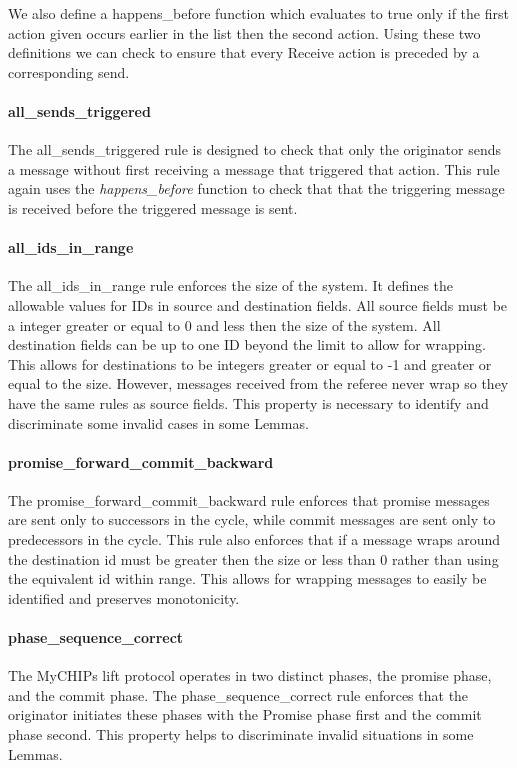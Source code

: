 \documentclass[runningheads]{llncs}
\begin{document}
We also define a happens\_before function which evaluates to true only if the first action given occurs earlier in the list then the second action. 
Using these two definitions we can check to ensure that every Receive action is preceded by a corresponding send. 

\paragraph{all\_sends\_triggered}
The all\_sends\_triggered rule is designed to check that only the originator sends a message without first receiving a message that triggered that action. This rule again uses the \emph{happens\_before} function to check that that the triggering message is received before the triggered message is sent. 

\paragraph{all\_ids\_in\_range}
The all\_ids\_in\_range rule enforces the size of the system. It defines the allowable values for IDs in source and destination fields. All source fields must be a integer greater or equal to 0 and less then the size of the system. All destination fields can be up to one ID beyond the limit to allow for wrapping. This allows for destinations to be integers greater or equal to -1 and greater or equal to the size. However, messages received from the referee never wrap so they have the same rules as source fields. This property is necessary to identify and discriminate some invalid cases in some Lemmas. 

\paragraph{promise\_forward\_commit\_backward}
The promise\_forward\_commit\_backward rule enforces that promise messages are sent only to successors in the cycle, while commit messages are sent only to predecessors in the cycle. This rule also enforces that if a message wraps around the destination id must be greater then the size or less than 0 rather than using the equivalent id within range. This allows for wrapping messages to easily be identified and preserves monotonicity.

\paragraph{phase\_sequence\_correct}
The MyCHIPs lift protocol operates in two distinct phases, the promise phase, and the commit phase. The phase\_sequence\_correct rule enforces that the originator initiates these phases with the Promise phase first and the commit phase second. This property helps to discriminate invalid situations in some Lemmas.
\end{document}
